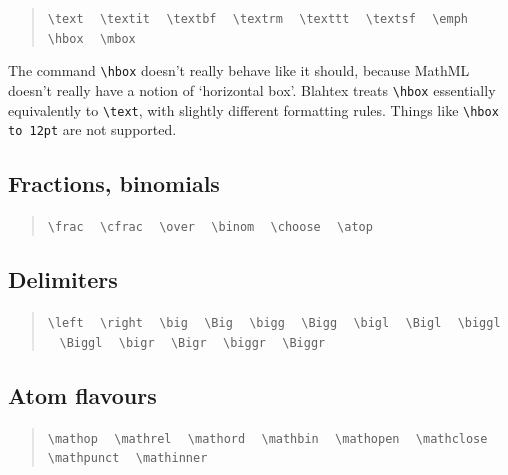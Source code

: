 \documentclass{article}
\newcommand{\texcommand}[1]{\textbackslash{}#1}
\newcommand{\spacer}{\,\,\, \hfil}
\newcommand{\lastspacer}{\hfill\hfill\hfill}
\newenvironment{mylist}{\begin{quote}}{\end{quote}}
\begin{document}
\begin{mylist}
\texttt{\texcommand{text}} \spacer
\texttt{\texcommand{textit}} \spacer
\texttt{\texcommand{textbf}} \spacer
\texttt{\texcommand{textrm}} \spacer
\texttt{\texcommand{texttt}} \spacer
\texttt{\texcommand{textsf}} \spacer
\texttt{\texcommand{emph}} \spacer
\texttt{\texcommand{hbox}} \spacer
\texttt{\texcommand{mbox}} \lastspacer
\end{mylist}

The command \texttt{\texcommand{hbox}} doesn't really behave like it should, because MathML doesn't really have a notion of `horizontal box'. Blahtex treats \texttt{\texcommand{hbox}} essentially equivalently to \texttt{\texcommand{text}}, with slightly different formatting rules. Things like \texttt{\texcommand{hbox} to 12pt} are not supported.

\subsection{Fractions, binomials}

\begin{mylist}
\texttt{\texcommand{frac}} \spacer
\texttt{\texcommand{cfrac}} \spacer
\texttt{\texcommand{over}} \spacer
\texttt{\texcommand{binom}} \spacer
\texttt{\texcommand{choose}} \spacer
\texttt{\texcommand{atop}} \lastspacer
\end{mylist}

\subsection{Delimiters}

\begin{mylist}
\texttt{\texcommand{left}} \spacer
\texttt{\texcommand{right}} \spacer
\texttt{\texcommand{big}} \spacer
\texttt{\texcommand{Big}} \spacer
\texttt{\texcommand{bigg}} \spacer
\texttt{\texcommand{Bigg}} \spacer
\texttt{\texcommand{bigl}} \spacer
\texttt{\texcommand{Bigl}} \spacer
\texttt{\texcommand{biggl}} \spacer
\texttt{\texcommand{Biggl}} \spacer
\texttt{\texcommand{bigr}} \spacer
\texttt{\texcommand{Bigr}} \spacer
\texttt{\texcommand{biggr}} \spacer
\texttt{\texcommand{Biggr}} \lastspacer
\end{mylist}

\subsection{Atom flavours}

\begin{mylist}
\texttt{\texcommand{mathop}} \spacer
\texttt{\texcommand{mathrel}} \spacer
\texttt{\texcommand{mathord}} \spacer
\texttt{\texcommand{mathbin}} \spacer
\texttt{\texcommand{mathopen}} \spacer
\texttt{\texcommand{mathclose}} \spacer
\texttt{\texcommand{mathpunct}} \spacer
\texttt{\texcommand{mathinner}} \lastspacer
\end{mylist}
\end{document}
